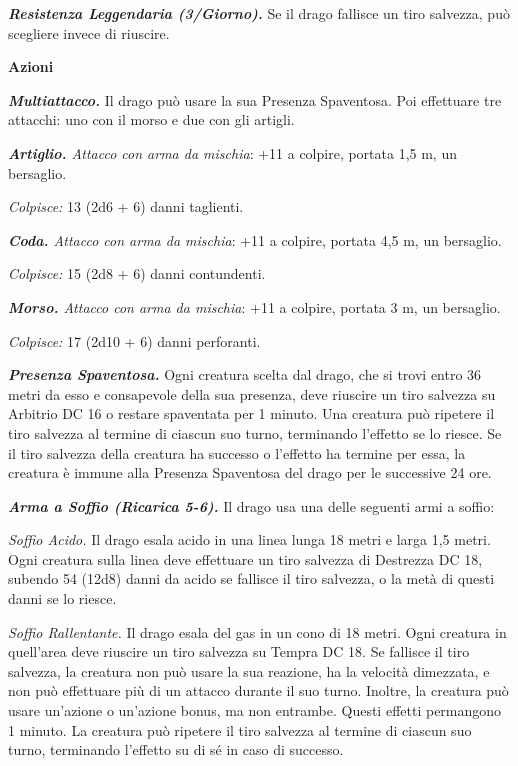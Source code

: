 \begin{multicols}{2}
\emph{\textbf{Resistenza Leggendaria (3/Giorno).}} Se il drago fallisce
un tiro salvezza, può scegliere invece di riuscire.

\textbf{Azioni}

\emph{\textbf{Multiattacco.}} Il drago può usare la sua Presenza
Spaventosa. Poi effettuare tre attacchi: uno con il morso e due con gli
artigli.

\emph{\textbf{Artiglio.} Attacco con arma da mischia}: +11 a colpire,
portata 1,5 m, un bersaglio.

\emph{Colpisce:} 13 (2d6 + 6) danni taglienti.

\emph{\textbf{Coda.} Attacco con arma da mischia}: +11 a colpire,
portata 4,5 m, un bersaglio.

\emph{Colpisce:} 15 (2d8 + 6) danni contundenti.

\emph{\textbf{Morso.} Attacco con arma da mischia}: +11 a colpire,
portata 3 m, un bersaglio.

\emph{Colpisce:} 17 (2d10 + 6) danni perforanti.

\emph{\textbf{Presenza Spaventosa.}} Ogni creatura scelta dal drago, che
si trovi entro 36 metri da esso e consapevole della sua presenza, deve
riuscire un tiro salvezza su Arbitrio DC 16 o restare spaventata per 1
minuto. Una creatura può ripetere il tiro salvezza al termine di ciascun
suo turno, terminando l'effetto se lo riesce. Se il tiro salvezza della
creatura ha successo o l'effetto ha termine per essa, la creatura è
immune alla Presenza Spaventosa del drago per le successive 24 ore.

\emph{\textbf{Arma a Soffio (Ricarica 5-6).}} Il drago usa una delle
seguenti armi a soffio:

\emph{Soffio Acido.} Il drago esala acido in una linea lunga 18 metri e
larga 1,5 metri. Ogni creatura sulla linea deve effettuare un tiro
salvezza di Destrezza DC 18, subendo 54 (12d8) danni da acido se
fallisce il tiro salvezza, o la metà di questi danni se lo riesce.

\emph{Soffio Rallentante.} Il drago esala del gas in un cono di 18
metri. Ogni creatura in quell'area deve riuscire un tiro salvezza su Tempra DC 18. Se fallisce il tiro salvezza, la creatura non può
usare la sua reazione, ha la velocità dimezzata, e non può effettuare
più di un attacco durante il suo turno. Inoltre, la creatura può usare
un'azione o un'azione bonus, ma non entrambe. Questi effetti permangono
1 minuto. La creatura può ripetere il tiro salvezza al termine di
ciascun suo turno, terminando l'effetto su di sé in caso di successo.


\end{multicols}
